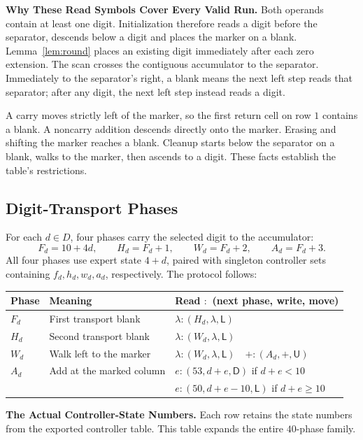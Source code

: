 \documentclass[11pt,a4paper]{article}
\newcommand{\blank}{\lambda}
\newcommand{\triple}[3]{(#1,#2,\mathsf{#3})}
\begin{document}
\textbf{Why These Read Symbols Cover Every Valid Run.}
Both operands contain at least one digit. Initialization therefore reads a digit before
the separator, descends below a digit and places the marker on a blank.
Lemma~\ref{lem:round} places an existing digit immediately after each zero extension. The scan crosses the contiguous accumulator to the separator.
Immediately to the separator's right, a blank means the next left step
reads that separator; after any digit, the next left step instead reads a digit.

A carry moves strictly left of the marker, so the first return cell on
row $1$ contains a blank. A noncarry addition descends directly onto the marker.
Erasing and shifting the marker reaches a blank. Cleanup
starts below the separator on a blank, walks to the marker, then ascends
to a digit. These facts establish the table's restrictions.

\newpage
\subsection{Digit-Transport Phases}\label{sec:part3}
For each $d\in D$, four phases carry the selected digit to the accumulator:
\[
F_d=10+4d,\qquad H_d=F_d+1,\qquad W_d=F_d+2,\qquad A_d=F_d+3.
\]
All four phases use expert state $4+d$, paired with singleton controller
sets containing $f_d,h_d,w_d,a_d$, respectively. The protocol follows:

\begin{center}
\small\renewcommand{\arraystretch}{1.35}
\begin{tabular}{lll}
\toprule\rowcolor{Pale}Phase & Meaning & Read $:$ (next phase, write, move)\\\midrule
$F_d$ & First transport blank & $\blank:\triple{H_d}{\blank}{L}$\\
$H_d$ & Second transport blank & $\blank:\triple{W_d}{\blank}{L}$\\
$W_d$ & Walk left to the marker & $\blank:\triple{W_d}{\blank}{L}\quad +:\triple{A_d}{+}{U}$\\
$A_d$ & Add at the marked column & $e:\triple{53}{d+e}{D}$ if $d+e<10$\\
 & & $e:\triple{50}{d+e-10}{L}$ if $d+e\ge10$\\
\bottomrule
\end{tabular}
\end{center}

\textbf{The Actual Controller-State Numbers.}
Each row retains the state numbers from the exported controller table. This table expands the entire $40$-phase family.
\end{document}
